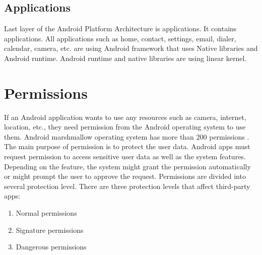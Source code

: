 \subsection{Applications}
Last layer of the Android Platform Architecture is applications. It contains applications. All applications such as home, contact, settings, email, dialer, calendar, camera, etc. are using Android framework that uses Native libraries and Android runtime. Android runtime and native libraries are using linear kernel.


\section{Permissions}
If an Android application wants to use any resources such as camera, internet, location, etc., they need permission from the Android operating system to use them. Android marshmallow operating system has more than 200 permissions \cite{androidpermissions}. The main purpose of permission is to protect the user data. Android apps must request permission to access sensitive user data as well as the system features. Depending on the feature, the system might grant the permission automatically or might prompt the user to approve the request. Permissions are divided into several protection level. There are three protection levels that affect third-party apps:
\begin{enumerate}
    \item Normal permissions
    \item Signature permissions
    \item Dangerous permissions
\end{enumerate}
